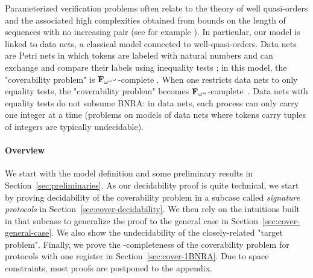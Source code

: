 Parameterized verification problems often relate to the theory of well quasi-orders
and the associated high complexities obtained from bounds on the length of sequences with no increasing pair (see for example \cite{WSTS}). 
In particular, our model is linked to data nets, a classical model connected to well-quasi-orders. Data nets are Petri nets in which tokens are labeled with natural numbers and can exchange and compare their labels using inequality tests \cite{LazicNORW08}; in this model, the "coverability problem" is $\mathbf{F}_{\omega^{\omega^{\omega}}}$-complete \cite{datanetsinequalityfomegaomegaomega}. When one restricts data nets to only equality tests, the "coverability problem" becomes $\mathbf{F}_{\omega^{\omega}}$-complete~\cite{Rosa-Velardo17}. Data nets with equality tests do not subsume BNRA: in data nets, each process can only carry one integer at a time (problems on models of data nets where tokens carry tuples of integers are typically undecidable).

\paragraph*{Overview}
We start with the model definition and some preliminary results in Section~\ref{sec:preliminaries}. As our decidability proof is quite technical, we start by proving decidability of the coverability problem in a subcase called \emph{signature protocols} in Section~\ref{sec:cover-decidability}.
We then rely on the intuitions built in that subcase to generalize the proof to the general case in Section~\ref{sec:cover-general-case}. We also show the undecidability of the closely-related "target problem".
Finally, we prove the \NP-completeness of the coverability problem for protocols with one register in Section~\ref{sec:cover-1BNRA}.
Due to space constraints, most proofs are postponed to the appendix.

